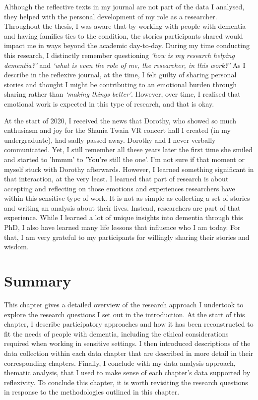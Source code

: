 Although the reflective texts in my journal are not part of the data I analysed, they helped with the personal development of my role as a researcher. Throughout the thesis, I was aware that by working with people with dementia and having families ties to the condition, the stories participants shared would impact me in ways beyond the academic day-to-day. During my time conducting this research, I distinctly remember questioning \textit{`how is my research helping dementia?'} and \textit{`what is even the role of me, the researcher, in this work?'} As I describe in the reflexive journal, at the time, I felt guilty of sharing personal stories and thought I might be contributing to an emotional burden through sharing rather than \textit{`making things better'}. However, over time, I realised that emotional work is expected in this type of research, and that is okay. 

At the start of 2020, I received the news that Dorothy, who showed so much enthusiasm and joy for the Shania Twain VR concert hall I created (in my undergraduate), had sadly passed away. Dorothy and I never verbally communicated. Yet, I still remember all these years later the first time she smiled and started to 'hmmm' to 'You're still the one'. I'm not sure if that moment or myself stuck with Dorothy afterwards. However, I learned something significant in that interaction, at the very least. I learned that part of research is about accepting and reflecting on those emotions and experiences researchers have within this sensitive type of work. It is not as simple as collecting a set of stories and writing an analysis about their lives. Instead, researchers are part of that experience. While I learned a lot of unique insights into dementia through this PhD, I also have learned many life lessons that influence who I am today. For that, I am very grateful to my participants for willingly sharing their stories and wisdom.

\section{Summary}
\label{Method:summary}
This chapter gives a detailed overview of the research approach I undertook to explore the research questions I set out in the introduction. At the start of this chapter, I describe participatory approaches and how it has been reconstructed to fit the needs of people with dementia, including the ethical considerations required when working in sensitive settings. I then introduced descriptions of the data collection within each data chapter that are described in more detail in their corresponding chapters. Finally, I conclude with my data analysis approach, thematic analysis, that I used to make sense of each chapter's data supported by reflexivity. To conclude this chapter, it is worth revisiting the research questions in response to the methodologies outlined in this chapter.

